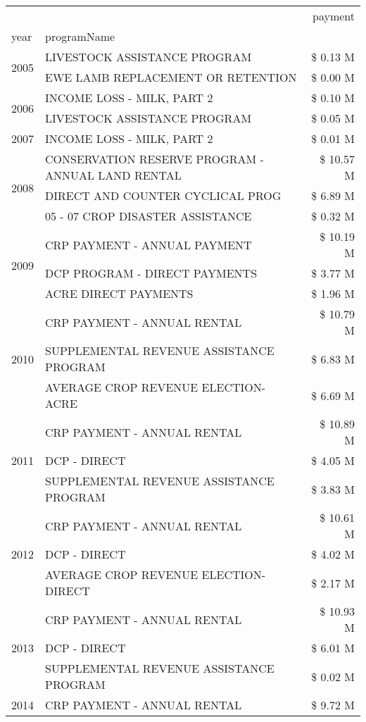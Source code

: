 \begin{tabular}{llr}
\toprule
 &  & payment \\
year & programName &  \\
\midrule
\multirow[t]{2}{*}{2005} & LIVESTOCK ASSISTANCE PROGRAM & \$ 0.13 M \\
 & EWE LAMB REPLACEMENT OR RETENTION & \$ 0.00 M \\
\cline{1-3}
\multirow[t]{2}{*}{2006} & INCOME LOSS - MILK, PART 2 & \$ 0.10 M \\
 & LIVESTOCK ASSISTANCE PROGRAM & \$ 0.05 M \\
\cline{1-3}
2007 & INCOME LOSS - MILK, PART 2 & \$ 0.01 M \\
\cline{1-3}
\multirow[t]{3}{*}{2008} & CONSERVATION RESERVE PROGRAM - ANNUAL LAND RENTAL & \$ 10.57 M \\
 & DIRECT AND COUNTER CYCLICAL PROG & \$ 6.89 M \\
 & 05 - 07 CROP DISASTER ASSISTANCE & \$ 0.32 M \\
\cline{1-3}
\multirow[t]{3}{*}{2009} & CRP PAYMENT - ANNUAL PAYMENT & \$ 10.19 M \\
 & DCP PROGRAM - DIRECT PAYMENTS & \$ 3.77 M \\
 & ACRE DIRECT PAYMENTS & \$ 1.96 M \\
\cline{1-3}
\multirow[t]{3}{*}{2010} & CRP PAYMENT - ANNUAL RENTAL & \$ 10.79 M \\
 & SUPPLEMENTAL REVENUE ASSISTANCE PROGRAM & \$ 6.83 M \\
 & AVERAGE CROP REVENUE ELECTION-ACRE & \$ 6.69 M \\
\cline{1-3}
\multirow[t]{3}{*}{2011} & CRP PAYMENT - ANNUAL RENTAL & \$ 10.89 M \\
 & DCP - DIRECT & \$ 4.05 M \\
 & SUPPLEMENTAL REVENUE ASSISTANCE PROGRAM & \$ 3.83 M \\
\cline{1-3}
\multirow[t]{3}{*}{2012} & CRP PAYMENT - ANNUAL RENTAL & \$ 10.61 M \\
 & DCP - DIRECT & \$ 4.02 M \\
 & AVERAGE CROP REVENUE ELECTION-DIRECT & \$ 2.17 M \\
\cline{1-3}
\multirow[t]{3}{*}{2013} & CRP PAYMENT - ANNUAL RENTAL & \$ 10.93 M \\
 & DCP - DIRECT & \$ 6.01 M \\
 & SUPPLEMENTAL REVENUE ASSISTANCE PROGRAM & \$ 0.02 M \\
\cline{1-3}
\multirow[t]{3}{*}{2014} & CRP PAYMENT - ANNUAL RENTAL & \$ 9.72 M \\

\end{tabular}
